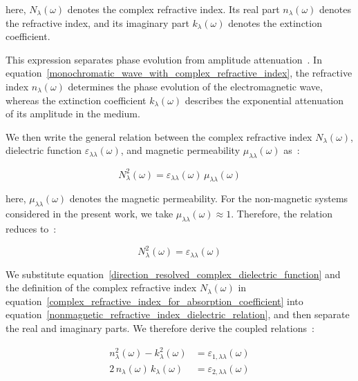 here, $N_{\lambda}(\omega)$ denotes the complex refractive index.
Its real part $n_{\lambda}(\omega)$ denotes the refractive index,
and its imaginary part $k_{\lambda}(\omega)$ denotes the extinction coefficient.

This expression separates phase evolution from amplitude attenuation~\cite{wooten2013optical,dressel2002electrodynamics,born2013principles}.
In equation~\eqref{monochromatic_wave_with_complex_refractive_index},
the refractive index $n_{\lambda}(\omega)$ determines the phase evolution of the electromagnetic wave,
whereas the extinction coefficient $k_{\lambda}(\omega)$ describes the exponential attenuation of its amplitude in the medium.

We then write the general relation between the complex refractive index $N_{\lambda}(\omega)$,
dielectric function $\varepsilon_{\lambda\lambda}(\omega)$,
and magnetic permeability $\mu_{\lambda\lambda}(\omega)$ as~\cite{born2013principles,wooten2013optical,dressel2002electrodynamics,politano2023spectroscopic}:

\begin{equation}
    N_{\lambda}^{2}(\omega)
    = \varepsilon_{\lambda\lambda}(\omega)\,\mu_{\lambda\lambda}(\omega)
\label{general_refractive_index_permeability_relation}
\end{equation}

here, $\mu_{\lambda\lambda}(\omega)$ denotes the magnetic permeability.
For the non-magnetic systems considered in the present work,
we take $\mu_{\lambda\lambda}(\omega)\approx 1$.
Therefore, the relation reduces to~\cite{wooten2013optical,dressel2002electrodynamics,born2013principles}:

\begin{equation}
    N_{\lambda}^{2}(\omega)
    = \varepsilon_{\lambda\lambda}(\omega)
\label{nonmagnetic_refractive_index_dielectric_relation}
\end{equation}

We substitute equation~\eqref{direction_resolved_complex_dielectric_function}
and the definition of the complex refractive index $N_{\lambda}(\omega)$ in equation~\eqref{complex_refractive_index_for_absorption_coefficient}
into equation~\eqref{nonmagnetic_refractive_index_dielectric_relation},
and then separate the real and imaginary parts.
We therefore derive the coupled relations~\cite{wooten2013optical,dressel2002electrodynamics,fox2010optical}:

\begin{equation}
\begin{aligned}
    n_{\lambda}^{2}(\omega)-k_{\lambda}^{2}(\omega)
    &= \varepsilon_{1,\lambda\lambda}(\omega) \\
    2\,n_{\lambda}(\omega)\,k_{\lambda}(\omega)
    &= \varepsilon_{2,\lambda\lambda}(\omega)
\end{aligned}
\label{refractive_index_extinction_coefficient_auxiliary_relations}
\end{equation}

